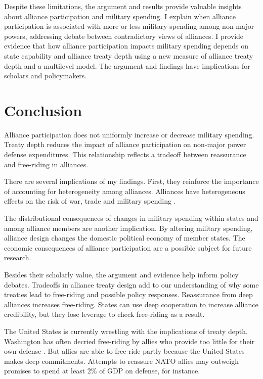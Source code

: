 \documentclass[12pt]{article}
\begin{document}
Despite these limitations, the argument and results provide valuable insights about alliance participation and military spending. 
I explain when alliance participation is associated with more or less military spending among non-major powers, addressing debate between contradictory views of alliances.  
I provide evidence that how alliance participation impacts military spending depends on state capability and alliance treaty depth using a new measure of alliance treaty depth and a multilevel model. 
The argument and findings have implications for scholars and policymakers. 


\section*{Conclusion}

Alliance participation does not uniformly increase or decrease military spending. 
Treaty depth reduces the impact of alliance participation on non-major power defense expenditures. 
This relationship reflects a tradeoff between reassurance and free-riding in alliances. 


There are several implications of my findings.  
First, they reinforce the importance of accounting for heterogeneity among alliances.
Alliances have heterogeneous effects on the risk of war, trade and military spending \citep{Leeds2003, LongLeeds2006, Benson2012, DigiuseppePoast2016}. 


The distributional consequences of changes in military spending within states and among alliance members are another implication.  
By altering military spending, alliance design changes the domestic political economy of member states. 
The economic consequences of alliance participation are a possible subject for future research. 


Besides their scholarly value, the argument and evidence help inform policy debates. 
Tradeoffs in alliance treaty design add to our understanding of why some treaties lead to free-riding and possible policy responses. 
Reassurance from deep alliances increases free-riding. 
States can use deep cooperation to increase alliance credibility, but they lose leverage to check free-riding as a result. 


The United States is currently wrestling with the implications of treaty depth. 
Washington has often decried free-riding by allies who provide too little for their own defense \citep{Lanoszka2015}. 
But allies are able to free-ride partly because the United States makes deep commitments. 
Attempts to reassure NATO allies may outweigh promises to spend at least 2\% of GDP on defense, for instance.
\end{document}
